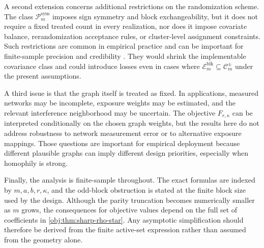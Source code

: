 A second extension concerns additional restrictions on the randomization scheme. The class \(\mathcal P_m^{\mathrm{sym}}\) imposes sign symmetry and block exchangeability, but it does not require a fixed treated count in every realization, nor does it impose covariate balance, rerandomization acceptance rules, or cluster-level assignment constraints. Such restrictions are common in empirical practice and can be important for finite-sample precision and credibility \citep{savje2021,zigler2018}. They would shrink the implementable covariance class and could introduce losses even in cases where \(\mathcal E_m^{\mathrm{blk}}\subseteq\mathcal C_m^{\pm}\) under the present assumptions.

A third issue is that the graph itself is treated as fixed. In applications, measured networks may be incomplete, exposure weights may be estimated, and the relevant interference neighborhood may be uncertain. The objective \(F_{r,\kappa}\) can be interpreted conditionally on the chosen graph weights, but the results here do not address robustness to network measurement error or to alternative exposure mappings. Those questions are important for empirical deployment because different plausible graphs can imply different design priorities, especially when homophily is strong.

Finally, the analysis is finite-sample throughout. The exact formulas are indexed by \(m,a,b,r,\kappa\), and the odd-block obstruction is stated at the finite block size used by the design. Although the parity truncation becomes numerically smaller as \(m\) grows, the consequences for objective values depend on the full set of coefficients in \cref{obj:thm:sharp-rho-star}. Any asymptotic simplification should therefore be derived from the finite active-set expression rather than assumed from the geometry alone.
